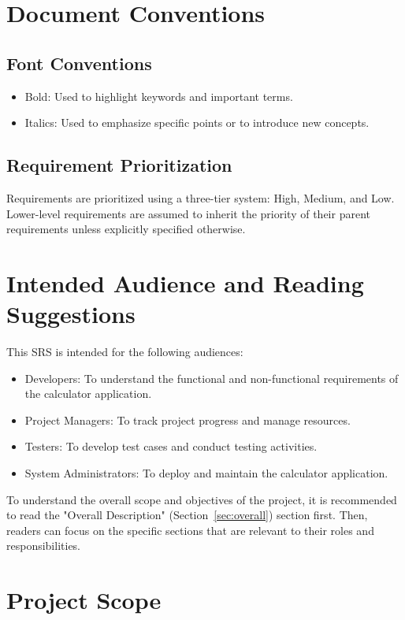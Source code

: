 \documentclass{scrreprt}
\begin{document}
\section{Document Conventions}
\subsection*{Font Conventions}
\begin{itemize} 
    \item Bold: Used to highlight keywords and important terms.
    \item Italics: Used to emphasize specific points or to introduce new concepts.
\end{itemize}
\subsection*{Requirement Prioritization}
Requirements are prioritized using a three-tier system: High, Medium, and Low.
Lower-level requirements are assumed to inherit the priority of their parent requirements unless explicitly specified otherwise.

\section{Intended Audience and Reading Suggestions}
This SRS is intended for the following audiences:
\begin{itemize}
    \item Developers: To understand the functional and non-functional requirements of the calculator application.
    \item Project Managers: To track project progress and manage resources.
    \item Testers: To develop test cases and conduct testing activities.
    \item System Administrators: To deploy and maintain the calculator application.
\end{itemize}
To understand the overall scope and objectives of the project, it is recommended to read the "Overall Description" (Section~\ref{sec:overall}) section first. Then, readers can focus on the specific sections that are relevant to their roles and responsibilities.

\section{Project Scope}
\end{document}

